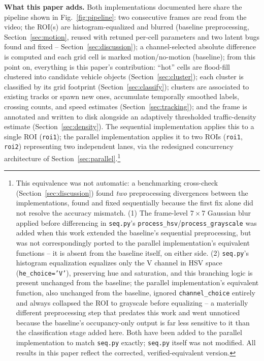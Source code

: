 \documentclass[conference]{IEEEtran}
\newcommand{\code}[1]{\texttt{#1}}
\begin{document}
\textbf{What this paper adds.} Both implementations documented here
share the pipeline shown in Fig.~\ref{fig:pipeline}: two consecutive
frames are read from the video; the ROI(s) are histogram-equalized and
blurred (baseline preprocessing, Section~\ref{sec:motion}, reused with
retuned per-cell parameters and two latent bugs found and fixed --
Section~\ref{sec:discussion}); a channel-selected absolute difference is
computed and each grid cell is marked motion/no-motion (baseline); from
this point on, everything is this paper's contribution: ``hot'' cells
are flood-fill clustered into candidate vehicle objects
(Section~\ref{sec:cluster}); each cluster is classified by its grid
footprint (Section~\ref{sec:classify}); clusters are associated to
existing tracks or spawn new ones, accumulate temporally smoothed
labels, crossing counts, and speed estimates (Section~\ref{sec:tracking});
and the frame is annotated and written to disk alongside an adaptively
thresholded traffic-density estimate (Section~\ref{sec:density}). The
sequential implementation applies this to a single ROI (\code{roi1});
the parallel implementation applies it to two ROIs (\code{roi1},
\code{roi2}) representing two independent lanes, via the redesigned
concurrency architecture of Section~\ref{sec:parallel}.\footnote{This
equivalence was not automatic: a benchmarking cross-check
(Section~\ref{sec:discussion}) found \emph{two} preprocessing
divergences between the implementations, found and fixed sequentially
because the first fix alone did not resolve the accuracy mismatch. (1)
The frame-level $7\times7$ Gaussian blur applied before differencing in
\code{seq.py}'s \code{process\_hsv}/\code{process\_grayscale} was added
when this work extended the baseline's sequential preprocessing, but
was not correspondingly ported to the parallel implementation's
equivalent functions -- it is absent from the baseline itself, on
either side. (2) \code{seq.py}'s histogram equalization equalizes only
the V channel in HSV space (\code{he\_choice='V'}), preserving hue and
saturation, and this branching logic is present unchanged from the
baseline; the parallel implementation's equivalent function, also
unchanged from the baseline, ignored \code{channel\_choice} entirely and
always collapsed the ROI to grayscale before equalizing -- a materially
different preprocessing step that predates this work and went unnoticed
because the baseline's occupancy-only output is far less sensitive to
it than the classification stage added here. Both have been added to
the parallel implementation to match \code{seq.py} exactly;
\code{seq.py} itself was not modified. All results in this paper reflect
the corrected, verified-equivalent version.}
\end{document}
